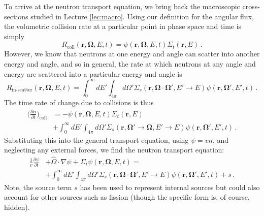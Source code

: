 To arrive at the neutron transport equation, we bring back the macroscopic cross-sections studied in Lecture \ref{lec:macro}.  Using our definition for the angular flux, the volumetric collision rate at a particular point in phase space and time is simply
\begin{equation}
 R_{\text{coll}}(\mathbf{r},\mathbf{\Omega},E,t) = \psi(\mathbf{r},\mathbf{\Omega},E,t) \Sigma_t(\mathbf{r},E) \, .
\end{equation}
However, we know that neutrons at one energy and angle can scatter into another energy and angle, and so in general, the rate at which neutrons at any angle and energy are scattered into a particular energy and angle is
\begin{equation}
 R_{\text{in-scatter}}(\mathbf{r},\mathbf{\Omega},E,t) = \int^{\infty}_{0} dE' \int_{4\pi} d\Omega' \Sigma_s(\mathbf{r},\mathbf{\Omega}\cdot\mathbf{\Omega}',E'\to E)\psi(\mathbf{r},\mathbf{\Omega'},E',t) \, .
\end{equation}
The time rate of change due to collisions is thus
\begin{equation}
\begin{split}
 \Big( \frac{\partial n}{\partial t} \Big )_{\mathrm{coll}} &= -\psi(\mathbf{r},\mathbf{\Omega},E,t) \Sigma_t(\mathbf{r},E)  \\
  &+ \int^{\infty}_{0} dE' \int_{4\pi} d\Omega' \Sigma_s(\mathbf{r},\mathbf{\Omega}'\to \mathbf{\Omega},E'\to E)\psi(\mathbf{r},\mathbf{\Omega'},E',t) \, .
\end{split}
\end{equation}
Substituting this into the general transport equation, using $\psi = vn$, and neglecting any external forces, we find the neutron transport equation:
\begin{equation}
  \begin{split}
     \frac{1}{v}\frac{\partial \psi}{\partial t} &+ \hat{\Omega} \cdot \nabla \psi + \Sigma_t \psi(\mathbf{r},\mathbf{\Omega},E,t) = \\
           &+ \int^{\infty}_{0} dE' \int_{4\pi} d\Omega' \Sigma_s(\mathbf{r},\mathbf{\Omega}\cdot\mathbf{\Omega}',E'\to E)\psi(\mathbf{r},\mathbf{\Omega'},E',t) +s \, .
  \end{split}
  \label{eq:neutrontransport}
\end{equation}
Note, the source term $s$ has been used to represent internal sources but could also account for other sources such as fission (though the specific form is, of course, hidden).

